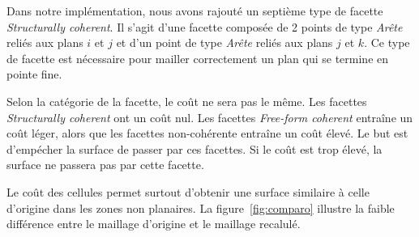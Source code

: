 ﻿\documentclass[12pt, twoside]{article}
\begin{document}
Dans notre implémentation, nous avons rajouté un septième type de facette \textit{Structurally coherent}. Il s'agit d'une facette composée de 2 points de type \textit{Arête} reliés aux plans $i$ et $j$ et d'un point de type \textit{Arête} reliés aux plans $j$ et $k$. Ce type de facette est nécessaire pour mailler correctement un plan qui se termine en pointe fine.

Selon la catégorie de la facette, le coût ne sera pas le même. Les facettes \textit{Structurally coherent} ont un coût nul. Les facettes \textit{Free-form coherent} entraîne un coût léger, alors que les facettes non-cohérente entraîne un coût élevé. Le but est d'empécher la surface de passer par ces facettes. Si le coût est trop élevé, la surface ne passera pas par cette facette.

Le coût des cellules permet surtout d'obtenir une surface similaire à celle d'origine dans les zones non planaires. La figure~\ref{fig:comparo} illustre la faible différence entre le maillage d'origine et le maillage recalulé.
\end{document}
